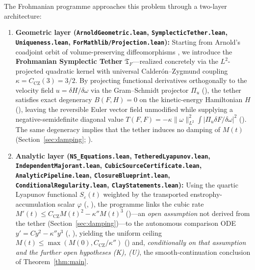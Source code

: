 \documentclass[11pt,a4paper]{article}
\theoremstyle{plain}
\theoremstyle{definition}
\theoremstyle{remark}
\newcommand{\Tf}{\mathfrak{T}_F}
\newcommand{\CZ}{C_{\mathrm{CZ}}}
\begin{document}
The Frohmanian programme approaches this problem through a two-layer architecture:
\begin{enumerate}
\item \textbf{Geometric layer (\texttt{ArnoldGeometric.lean}, \texttt{SymplecticTether.lean}, \texttt{Uniqueness.lean}, \texttt{ForMathlib/Projection.lean}):} Starting from Arnold's coadjoint orbit of volume-preserving diffeomorphisms \cite{Arnold1966,ArnoldKhesin1998}, we introduce the \textbf{Frohmanian Symplectic Tether} $\Tf$---realized concretely via the $L^2$-projected quadratic kernel  with universal Calderón--Zygmund coupling $\kappa=\CZ(3)=3/2$. By projecting functional derivatives orthogonally to the velocity field $u=\delta H/\delta\omega$ via the Gram--Schmidt projector $\Pi_u$ (), the tether satisfies exact degeneracy $B(F,H)=0$ on the kinetic-energy Hamiltonian $H$ (), leaving the reversible Euler vector field unmodified while supplying a negative-semidefinite diagonal value $T(F,F)=-\kappa\|\omega\|_{L^2}^2\int|\Pi_u\delta F/\delta\omega|^2$ (). The same degeneracy implies that the tether induces no damping of $M(t)$ (Section~\ref{sec:damping}; ).
\item \textbf{Analytic layer (\texttt{NS\_Equations.lean}, \texttt{TetheredLyapunov.lean}, \texttt{IndependentMajorant.lean}, \texttt{CubicSourceCertificate.lean}, \texttt{AnalyticPipeline.lean}, \texttt{ClosureBlueprint.lean}, \texttt{ConditionalRegularity.lean}, \texttt{ClayStatements.lean}):} Using the quartic Lyapunov functional $S_\varepsilon(t)$ weighted by the transported enstrophy-accumulation scalar $\varphi$ (, ), the programme links the cubic rate $M'(t)\le \CZ M(t)^2-\kappa'' M(t)^3$ ()---an \emph{open assumption} not derived from the tether (Section~\ref{sec:damping})---to the autonomous comparison ODE $y'=Cy^2-\kappa''y^3$ (, ), yielding the uniform ceiling $M(t)\le\max(M(0),\CZ/\kappa'')$ () and, \emph{conditionally on that assumption and the further open hypotheses (K), (U)}, the smooth-continuation conclusion of Theorem~\ref{thm:main}.
\end{enumerate}
\end{document}
